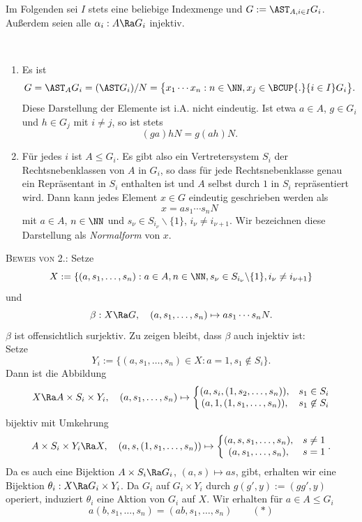 Im Folgenden sei $I$ stets eine beliebige Indexmenge und
$G:=\AST_{A,i\in I} G_i$. Außerdem seien alle
$\alpha_i:A\Ra G_i$ injektiv.

\DB\label{bem_NF} \
\begin{enumerate}
\item Es ist
\[
G = \AST_A G_i = (\AST G_i)/N
=\bigl\{x_1\cdots x_n : n\in\NN, x_j\in\BCUP{.}{i\in I} G_i \bigr\}.
\]
Diese Darstellung der Elemente ist i.A. nicht eindeutig.
Ist etwa $a\in A$, $g\in G_i$ und $h\in G_j$ mit $i\neq j$, so
ist stets
\[
(ga)hN = g(ah)N.
\]
\item Für jedes $i$ ist $A\leq G_i$. Es gibt also ein Vertretersystem
$S_i$ der Rechtsnebenklassen von $A$ in $G_i$, so
dass für jede Rechtsnebenklasse genau ein Repräsentant
in $S_i$ enthalten ist und $A$ selbst durch $1$ in $S_i$ repräsentiert
wird.
Dann kann jedes Element $x\in G$ eindeutig geschrieben werden
als
\[
x = as_1\cdots s_n N
\]
mit $a\in A$, $n\in\NN$ und $s_{\nu}\in S_{i_{\nu}}\backslash\{1\}$,
$i_{\nu}\neq i_{\nu+1}$.
Wir bezeichnen diese Darstellung als \emph{Normalform} von $x$.
\end{enumerate}
\textsc{Beweis von 2.:}
Setze
\[
X :=
\{ (a,s_1,\ldots,s_n): a\in A, n\in\NN,
s_{\nu}\in S_{i_{\nu}}\backslash\{1\},
i_{\nu}\neq i_{\nu+1} \}
\]
und
\[
\beta:X\Ra G,\quad (a,s_1,\ldots,s_n)\mapsto a s_1\cdots s_n N.
\]
$\beta$ ist offensichtlich surjektiv. Zu zeigen bleibt,
dass $\beta$ auch injektiv ist:\\
Setze
\[
Y_i :=
\{ (a,s_1,\ldots,s_n)\in X : a=1, s_1\not\in S_i \}.
\]
Dann ist die Abbildung
\[
X\Ra A\times S_i\times Y_i,\quad
(a,s_1,\ldots,s_n)\mapsto \left\{
\begin{matrix}
(a,s_i,(1,s_2,\ldots,s_n)), & s_1\in S_i \\
(a,1,(1,s_1,\ldots,s_n)), & s_1\not\in S_i
\end{matrix}
\right.
\]
bijektiv mit Umkehrung
\[
A\times S_i\times Y_i \Ra X,\quad
(a,s,(1,s_1,\ldots,s_n))\mapsto \left\{
\begin{matrix}
(a,s,s_1,\ldots,s_n), & s \neq 1 \\
(a,s_1,\ldots,s_n), & s = 1
\end{matrix}
\right..
\]
Da es auch eine Bijektion
$A\times S_i \Ra G_i$, $(a,s)\mapsto as$, gibt,
erhalten wir eine Bijektion
$\theta_i:X\Ra G_i\times Y_i$.
Da $G_i$ auf $G_i\times Y_i$ durch $g(g',y):=(gg',y)$ operiert,
induziert $\theta_i$ eine Aktion von $G_i$ auf $X$.
Wir erhalten für $a\in A\leq G_i$
\[
a(b,s_1,\ldots,s_n) = (ab,s_1,\ldots,s_n)\qquad (*)
\]
